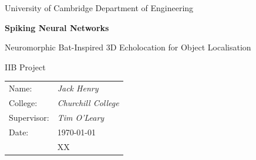 \documentclass[12pt,a4paper]{report}
\begin{document}
\begin{titlepage}
  \centering
  \vspace*{2cm}
  {\Large University of Cambridge Department of Engineering\par}
  \vspace{1.5cm}
  {\Huge\bfseries Spiking Neural Networks \par}
    \vspace{1.5cm}
  {\LARGE Neuromorphic Bat-Inspired 3D Echolocation for Object Localisation \par}
  \vspace{1.5cm}
  {\Large IIB Project\par}
  \vfill
  \begin{tabular}{ll}
    Name: & \textit{Jack Henry}\\
    College: & \textit{Churchill College}\\
    Supervisor: & \textit{Tim O'Leary}\\
    Date: & \today\\
    [SWAP FOR REAL TITLE PAGE] & XX \\
  \end{tabular}
\end{titlepage}






\clearpage

\tableofcontents



\clearpage












\appendix
\end{document}
